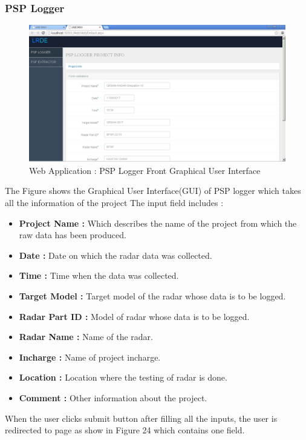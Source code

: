 \documentclass[14pt]{article} %
\begin{document}
\subsubsection{PSP Logger}
 \begin{figure}[H]
 \centering
   \includegraphics[width=\linewidth]{LoggerFrontPage.jpg}
  \caption{Web Application : PSP Logger Front Graphical User Interface}
  \label{fig:figure 22}
\end{figure}
 The Figure shows the Graphical User Interface(GUI) of PSP logger which takes all the information of the project 
  The input field includes :
  \begin{itemize} 
  \item[] \textbf{Project Name : }Which describes the name of the project from which the raw data has been produced.
  \item[] \textbf{Date : }Date on which the radar data was collected. 
  \item[] \textbf{Time : }Time when the data was collected.
  \item[] \textbf{Target Model : }Target model of the radar whose data is to be logged.  
  \item[] \textbf{Radar Part ID : }Model of radar whose data is to be logged.
  \item[] \textbf{Radar Name : }Name of the radar.
  \item[] \textbf{Incharge : }Name of project incharge.
  \item[] \textbf{Location : }Location where the testing of radar is done.
  \item[] \textbf{Comment : }Other information about the project.
  \end{itemize}
  When the user clicks submit button after filling all the inputs, the user is redirected to page as show in Figure 24 which contains one field.\\
\end{document}
